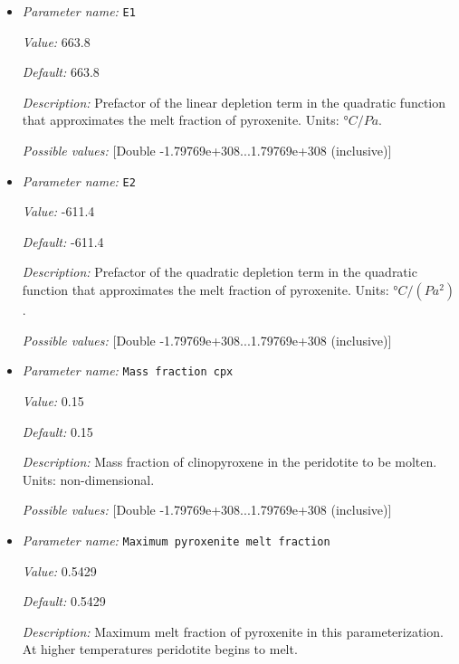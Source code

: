 \begin{itemize}
{\it Possible values:} [Double -1.79769e+308...1.79769e+308 (inclusive)]
\item {\it Parameter name:} {\tt E1}
\label{parameters:Material model/Latent heat melt/E1}


{\it Value:} 663.8


{\it Default:} 663.8


{\it Description:} Prefactor of the linear depletion term in the quadratic function that approximates the melt fraction of pyroxenite. Units: $°C/Pa$.


{\it Possible values:} [Double -1.79769e+308...1.79769e+308 (inclusive)]
\item {\it Parameter name:} {\tt E2}
\label{parameters:Material model/Latent heat melt/E2}


{\it Value:} -611.4


{\it Default:} -611.4


{\it Description:} Prefactor of the quadratic depletion term in the quadratic function that approximates the melt fraction of pyroxenite. Units: $°C/(Pa^2)$.


{\it Possible values:} [Double -1.79769e+308...1.79769e+308 (inclusive)]
\item {\it Parameter name:} {\tt Mass fraction cpx}
\label{parameters:Material model/Latent heat melt/Mass fraction cpx}


{\it Value:} 0.15


{\it Default:} 0.15


{\it Description:} Mass fraction of clinopyroxene in the peridotite to be molten. Units: non-dimensional.


{\it Possible values:} [Double -1.79769e+308...1.79769e+308 (inclusive)]
\item {\it Parameter name:} {\tt Maximum pyroxenite melt fraction}
\label{parameters:Material model/Latent heat melt/Maximum pyroxenite melt fraction}


{\it Value:} 0.5429


{\it Default:} 0.5429


{\it Description:} Maximum melt fraction of pyroxenite in this parameterization. At higher temperatures peridotite begins to melt.



\end{itemize}

